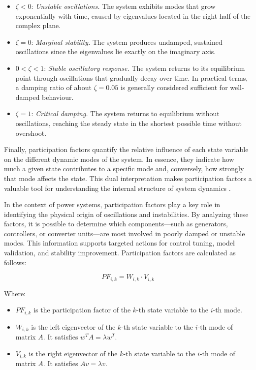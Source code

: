\begin{itemize}
  \item $\zeta < 0$: \textit{Unstable oscillations.} The system exhibits modes that grow exponentially with time, caused by eigenvalues located in the right half of the complex plane.
  \item $\zeta = 0$: \textit{Marginal stability.} The system produces undamped, sustained oscillations since the eigenvalues lie exactly on the imaginary axis.
  \item $0 < \zeta < 1$: \textit{Stable oscillatory response.} The system returns to its equilibrium point through oscillations that gradually decay over time. In practical terms, a damping ratio of about $\zeta = 0.05$ is generally considered sufficient for well-damped behaviour.
  \item $\zeta = 1$: \textit{Critical damping.} The system returns to equilibrium without oscillations, reaching the steady state in the shortest possible time without overshoot.
\end{itemize}

Finally, participation factors quantify the relative influence of each state variable on the different dynamic modes of the system. In essence,
they indicate how much a given state contributes to a specific mode and, conversely, how strongly that mode affects the state.
This dual interpretation makes participation factors a valuable tool for understanding the internal structure of system dynamics \cite{KonovaPF}.

In the context of power systems, participation factors play a key role in identifying the physical origin of oscillations and instabilities.
By analyzing these factors, it is possible to determine which components—such as generators, controllers, or converter units—are most involved in poorly damped or unstable modes.
This information supports targeted actions for control tuning, model validation, and stability improvement. Participation factors are calculated as follows:

\begin{equation}
PF_{i,k} = W_{i,k} \cdot V_{i,k}
\end{equation}

Where:
\begin{itemize}
  \item $PF_{i,k}$ is the participation factor of the $k$-th state variable to the $i$-th mode.
  \item $W_{i,k}$ is the left eigenvector of the $k$-th state variable to the $i$-th mode of matrix $A$. It satisfies $w^T A = \lambda w^T$.
  \item $V_{i,k}$ is the right eigenvector of the $k$-th state variable to the $i$-th mode of matrix $A$. It satisfies $A v= \lambda v$.
\end{itemize}

